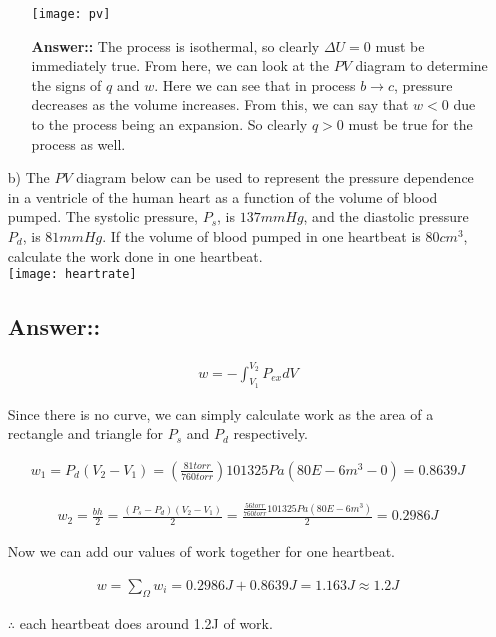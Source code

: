 \documentclass[12pt]{book}
\begin{document}
\begin{itemize}
\begin{itemize}
            \texttt{[image: pv]}

            \textbf{Answer::} The process is isothermal, so clearly $\Delta U=0$ must be immediately true. From here, we can look at the $PV$ diagram to determine the signs of $q$ and $w$. Here we can see that in process $b \rightarrow c$, pressure decreases as the volume increases. From this, we can say that $w<0$ due to the process being an expansion. So clearly $q>0$ must be true for the process as well.


        \end{itemize}
    \item[b)] The $PV$ diagram below can be used to represent the pressure dependence in a ventricle of
    the human heart as a function of the volume of blood pumped. The systolic pressure, $P_s$, is $137
    mmHg$, and the diastolic pressure $P_d$, is $81 mmHg$. If the volume of blood pumped in one heartbeat is $80 cm^3$, calculate the work done in one heartbeat.\\

    \texttt{[image: heartrate]}

    \subsection*{Answer::}

    \begin{align*}
        w=-\int_{V_1}^{V_2}P_{ex}dV
    \end{align*}

    Since there is no curve, we can simply calculate work as the area of a rectangle and triangle for $P_s$ and $P_d$ respectively.

    \begin{align*}
        w_1=P_d(V_2-V_1)=(\frac{81 torr}{760torr})101325Pa(80E-6m^3-0)=0.8639J
    \end{align*}

    \begin{align*}
        w_2=\frac{bh}{2}=\frac{(P_s-P_d)(V_2-V_1)}{2}=\frac{\frac{56torr}{760torr}101325Pa(80E-6m^3)}{2}=0.2986J
    \end{align*}

    Now we can add our values of work together for one heartbeat.

    \begin{align*}
        w=\sum_{\Omega}w_i=0.2986J+0.8639J=1.163J\approx 1.2J
    \end{align*}

    $\therefore$ each heartbeat does around 1.2J of work.
\end{itemize}
\end{document}
